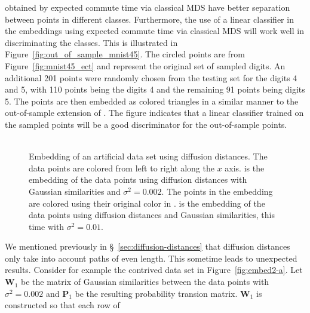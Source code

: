 obtained by expected commute time via classical MDS have better
separation between points in different classes.  Furthermore, the use
of a linear classifier in the embeddings using expected commute time
via classical MDS will work well in discriminating the classes.  This
is illustrated in Figure~\ref{fig:out_of_sample_mnist45}. The circled
points are from Figure~\ref{fig:mnist45_ect} and represent the
original set of sampled digits. An additional 201 points were randomly
chosen from the testing set for the digits 4 and 5, with 110 points
being the digits 4 and the remaining 91 points being digits 5. The
points are then embedded as colored triangles in a similar manner to
the out-of-sample extension of
\citet{bengio04:_out_lle_isomap_mds_eigen}. The figure indicates that
a linear classifier trained on the sampled points will be a good
discriminator for the out-of-sample points. \\ \\
\begin{figure}[htbp]
  \centering
    \hspace{8pt}
        \caption{Embedding of an artificial data set
           using diffusion distances. The data
          points are colored from left to right along the $x$
          axis.  is the embedding of the data
          points using diffusion distances with Gaussian similarities
          and $\sigma^{2} = 0.002$. The points in the embedding are
          colored using their original color in
          .  is the
          embedding of the data points using diffusion distances and
          Gaussian similarities, this time with $\sigma^{2} = 0.01$. }
  \label{fig:embed2}
\end{figure}
\noindent We mentioned previously in \S~\ref{sec:diffusion-distances} that
diffusion distances only take into account paths of even length. This
sometime leads to unexpected results. Consider for example the
contrived data set in Figure~\ref{fig:embed2-a}. Let $\mathbf{W}_1$ be
the matrix of Gaussian similarities between the data points with
$\sigma^{2} = 0.002$ and $\mathbf{P}_1$ be the resulting probability
transion matrix. $\mathbf{W}_1$ is constructed so that each row of
